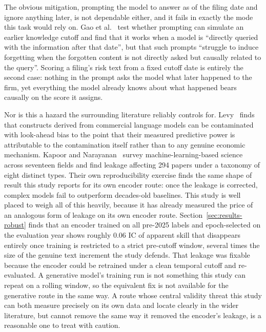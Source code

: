 \documentclass[logo,msc,ai]{infthesis}        %
\begin{document}
The obvious mitigation, prompting the model to answer as of the filing date and ignore anything later, is not dependable either, and it fails in exactly the mode this task would rely on. Gao et al.\ \cite{gao2025prompts} test whether prompting can simulate an earlier knowledge cutoff and find that it works when a model is ``directly queried with the information after that date'', but that such prompts ``struggle to induce forgetting when the forgotten content is not directly asked but causally related to the query''. Scoring a filing's risk text from a fixed cutoff date is entirely the second case: nothing in the prompt asks the model what later happened to the firm, yet everything the model already knows about what happened bears causally on the score it assigns.

Nor is this a hazard the surrounding literature reliably controls for. Levy~\cite{bradford2026caution} finds that constructs derived from commercial language models can be contaminated with look-ahead bias to the point that their measured predictive power is attributable to the contamination itself rather than to any genuine economic mechanism. Kapoor and Narayanan~\cite{kapoor2023leakage} survey machine-learning-based science across seventeen fields and find leakage affecting 294 papers under a taxonomy of eight distinct types. Their own reproducibility exercise finds the same shape of result this study reports for its own encoder route: once the leakage is corrected, complex models fail to outperform decades-old baselines. This study is well placed to weigh all of this heavily, because it has already measured the price of an analogous form of leakage on its own encoder route. Section~\ref{sec:results-robust} finds that an encoder trained on all pre-2025 labels and epoch-selected on the evaluation year shows roughly 0.06 IC of apparent skill that disappears entirely once training is restricted to a strict pre-cutoff window, several times the size of the genuine text increment the study defends. That leakage was fixable because the encoder could be retrained under a clean temporal cutoff and re-evaluated. A generative model's training run is not something this study can repeat on a rolling window, so the equivalent fix is not available for the generative route in the same way. A route whose central validity threat this study can both measure precisely on its own data and locate clearly in the wider literature, but cannot remove the same way it removed the encoder's leakage, is a reasonable one to treat with caution.
\end{document}
